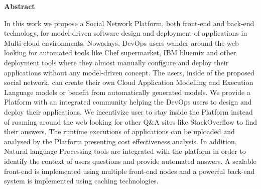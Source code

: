 \thispagestyle{empty}
\begin{titlepage}
\begin{center}
{\bf\Large Abstract}\\
\end{center}

\indent In this work we propose a Social Network Platform, both front-end and back-end technology, for model-driven software design and deployment of applications in Multi-cloud environments. Nowadays, DevOps users wander around the web looking for automated tools like Chef supermarket, IBM bluemix and other deployment tools where they almost manually configure and deploy their applications without any model-driven concept. The users, inside of the proposed social network, can create their own Cloud Application Modelling and Execution
Language models or benefit from automatically generated models. We provide a Platform with an integrated community helping the DevOps users to design and deploy their applications. We incentivize user to stay inside the Platform instead of roaming around the web looking for other Q\&A sites like StackOverflow to find their answers. The runtime executions of applications can be uploaded and analysed by the Platform presenting cost effectiveness analysis. In addition, Natural language Processing tools are integrated with the platform in order to identify the context of users questions and provide automated answers. A scalable front-end is implemented using multiple front-end nodes and a powerful back-end system is implemented using caching technologies. 


\vfill
\end{titlepage}


